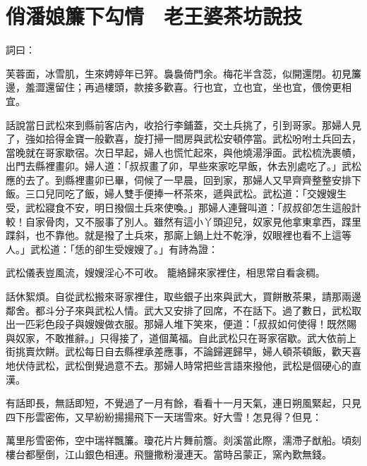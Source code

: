 %

\chapter{俏潘娘簾下勾情　老王婆茶坊說技}


\begin{showcontents}{}

詞曰：

芙蓉面，冰雪肌，生來娉婷年已笄。裊裊倚門余。梅花半含蕊，似開還閉。初見簾邊，羞澀還留住；再過樓頭，款接多歡喜。行也宜，立也宜，坐也宜，偎傍更相宜。

話說當日武松來到縣前客店內，收拾行李鋪蓋，交土兵挑了，引到哥家。那婦人見了，強如拾得金寶一般歡喜，旋打掃一間房與武松安頓停當。武松吩咐土兵回去，當晚就在哥家歇宿。次日早起，婦人也慌忙起來，與他燒湯淨面。武松梳洗裹幘，出門去縣裡畫卯。婦人道：「叔叔畫了卯，早些來家吃早飯，休去別處吃了。」武松應的去了。到縣裡畫卯已畢，伺候了一早晨，回到家，那婦人又早齊齊整整安排下飯。三口兒同吃了飯，婦人雙手便捧一杯茶來，遞與武松。武松道：「交嫂嫂生受，武松寢食不安，明日撥個土兵來使喚。」那婦人連聲叫道：「叔叔卻怎生這般計較！自家骨肉，又不服事了別人。雖然有這小丫頭迎兒，奴家見他拿東拿西，蹀里蹀斜，也不靠他。就是撥了土兵來，那廝上鍋上灶不乾淨，奴眼裡也看不上這等人。」武松道：「恁的卻生受嫂嫂了。」有詩為證：

武松儀表豈風流，嫂嫂淫心不可收。
籠絡歸來家裡住，相思常自看衾稠。

話休絮煩。自從武松搬來哥家裡住，取些銀子出來與武大，買餅散茶果，請那兩邊鄰舍。都斗分子來與武松人情。武大又安排了回席，不在話下。過了數日，武松取出一匹彩色段子與嫂嫂做衣服。那婦人堆下笑來，便道：「叔叔如何使得！既然賜與奴家，不敢推辭。」只得接了，道個萬福。自此武松只在哥家宿歇。武大依前上街挑賣炊餅。武松每日自去縣裡承差應事，不論歸遲歸早，婦人頓茶頓飯，歡天喜地伏侍武松，武松倒覺過意不去。那婦人時常把些言語來撥他，武松是個硬心的直漢。

有話即長，無話即短，不覺過了一月有餘，看看十一月天氣，連日朔風緊起，只見四下彤雲密佈，又早紛紛揚揚飛下一天瑞雪來。好大雪！怎見得？但見：

萬里彤雪密佈，空中瑞祥飄簾。瓊花片片舞前簷。剡溪當此際，濡滯子猷船。頃刻樓台都壓倒，江山銀色相連。飛鹽撒粉漫連天。當時呂蒙正，窯內歎無錢。


\end{showcontents}
